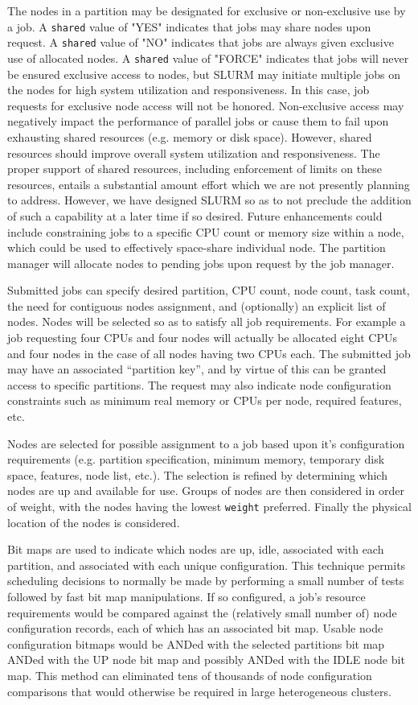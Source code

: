 The nodes in a partition may be designated for exclusive or non-exclusive
use by a job.  A {\tt shared} value of "YES" indicates that jobs may share nodes
upon request.  A {\tt shared} value of "NO" indicates that jobs are always given
exclusive use of allocated nodes.  A {\tt shared} value of "FORCE" indicates
that jobs will never be ensured exclusive access to nodes, but SLURM
may initiate multiple jobs on the nodes for high system utilization
and responsiveness.  In this case, job requests for exclusive node
access will not be honored.  Non-exclusive access may negatively impact
the performance of parallel jobs or cause them to fail upon exhausting
shared resources (e.g. memory or disk space). However, shared resources
should improve overall system utilization and responsiveness. The
proper support of shared resources, including enforcement of limits on
these resources, entails a substantial amount effort which we are not
presently planning to address.  However, we have designed SLURM so as
to not preclude the addition of such a capability at a later time if
so desired.  Future enhancements could include constraining jobs to a
specific CPU count or memory size within a node, which could be used
to effectively space-share individual node.  The partition manager will 
allocate nodes to pending jobs upon request by the job manager.

Submitted jobs can specify desired partition, CPU count, node count,
task count,  the need for contiguous nodes assignment, and (optionally)
an explicit list of nodes.  Nodes will be selected so as to satisfy all
job requirements.  For example a job requesting four CPUs and four nodes
will actually be allocated eight CPUs and four nodes in the case of all
nodes having two CPUs each.  The submitted job may have an associated
``partition key'', and by virtue of this can be granted access to specific partitions.
The request may also indicate node configuration constraints such as
minimum real memory or CPUs per node, required features, etc.

Nodes are selected for possible assignment to a job based upon it's
configuration requirements (e.g. partition specification, minimum memory,
temporary disk space, features, node list, etc.).  The selection is
refined by determining which nodes are up and available for use.
Groups of nodes are then considered in order of weight, with the
nodes having the lowest {\tt weight} preferred.
Finally the physical location of the nodes is considered.

Bit maps are used to indicate which nodes are up, idle, associated
with each partition, and associated with each unique configuration.
This technique permits scheduling decisions to normally be made by
performing a small number of tests followed by fast bit map manipulations. 
If so configured, a job's resource requirements would be compared 
against the (relatively small number of) node configuration records, each of 
which has an associated bit map. Usable node configuration bitmaps 
would be ANDed with the selected partitions bit map ANDed with the 
UP node bit map and possibly ANDed with the IDLE node bit map. 
This method can eliminated tens of thousands of node configuration 
comparisons that would otherwise be required in large heterogeneous 
clusters.

